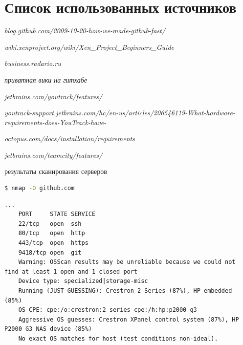 \documentclass{article}
\begin{document}
\pagebreak

\section{Список использованных источников}

\begin{thebibliography}{9}
    \textit{blog.github.com/2009-10-20-how-we-made-github-fast/}
     
    \textit{wiki.xenproject.org/wiki/Xen\_Project\_Beginners\_Guide}
     
    \textit{business.radario.ru}

    \textit{приватная вики на гитхабе}

    \textit{jetbrains.com/youtrack/features/}

    \textit{youtrack-support.jetbrains.com/hc/en-us/articles/206546119-What-hardware-requirements-does-YouTrack-have-}

    \textit{octopus.com/docs/installation/requirements}

    \textit{jetbrains.com/teamcity/features/}

результаты сканирования серверов

\begin{lstlisting}[language=bash, basicstyle=\ttfamily\small]
    $ nmap -O github.com
\end{lstlisting}
\begin{lstlisting}[frame=lines, basicstyle=\ttfamily\small]
    ...
    PORT     STATE SERVICE
    22/tcp   open  ssh
    80/tcp   open  http
    443/tcp  open  https
    9418/tcp open  git
    Warning: OSScan results may be unreliable because we could not find at least 1 open and 1 closed port
    Device type: specialized|storage-misc
    Running (JUST GUESSING): Crestron 2-Series (87%), HP embedded (85%)
    OS CPE: cpe:/o:crestron:2_series cpe:/h:hp:p2000_g3
    Aggressive OS guesses: Crestron XPanel control system (87%), HP P2000 G3 NAS device (85%)
    No exact OS matches for host (test conditions non-ideal).
\end{lstlisting}


\end{thebibliography}
\end{document}
